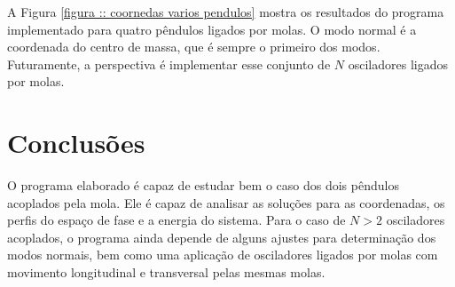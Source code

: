 \documentclass[a4paper, 11pt]{article}
\begin{document}
    A Figura \ref{figura :: coornedas varios pendulos} mostra os resultados do programa implementado para quatro pêndulos ligados por molas. O modo normal é a coordenada do centro de massa, que é sempre o primeiro dos modos. Futuramente, a perspectiva é implementar esse conjunto de $N$ osciladores ligados por molas.

\newpage
\section{ Conclusões }

    O programa elaborado é capaz de estudar bem o caso dos dois pêndulos acoplados pela mola. Ele é capaz de analisar as soluções para as coordenadas, os perfis do espaço de fase e a energia do sistema. Para o caso de $N>2$ osciladores acoplados, o programa ainda depende de alguns ajustes para determinação dos modos normais, bem como uma aplicação de osciladores ligados por molas com movimento longitudinal e transversal pelas mesmas molas.


\newpage
\nocite{*}


\end{document}
